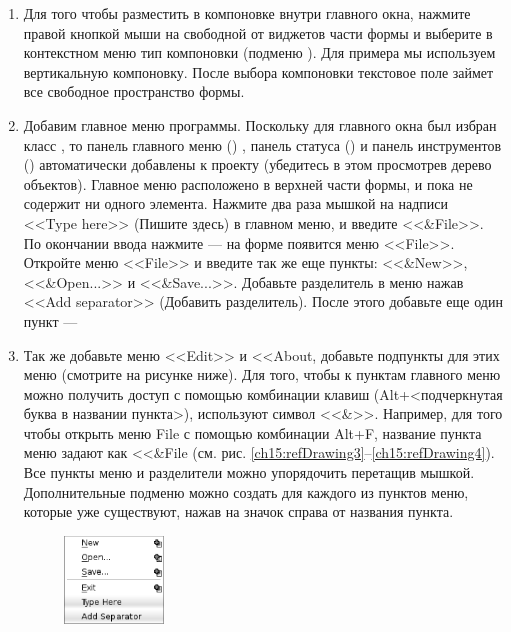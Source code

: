 \begin{enumerate}
\item Для того чтобы разместить  в компоновке внутри главного окна, нажмите правой
кнопкой мыши на свободной от виджетов части формы и выберите в контекстном меню тип компоновки (подменю
). Для примера мы используем вертикальную компоновку. После выбора компоновки текстовое
поле займет все свободное пространство формы.
\item Добавим главное меню программы. Поскольку для главного окна был избран класс , то панель главного меню
() , панель статуса () и панель инструментов () автоматически добавлены к проекту (убедитесь в этом просмотрев дерево объектов). Главное меню расположено в верхней части формы, и пока не содержит ни одного
элемента. Нажмите два раза мышкой на надписи <<Type here>> (Пишите здесь) в главном меню, и введите <<\&File>>. По окончании
ввода нажмите  --- на форме появится меню <<File>>. Откройте меню <<File>> и введите так же
еще пункты: <<\&New>>, <<\&Open...>> и <<\&Save...>>. Добавьте разделитель в меню
нажав <<Add separator>> (Добавить разделитель). После этого добавьте еще один пункт ---  
\item Так же добавьте меню <<Edit>> и <<About, добавьте подпункты для этих меню (смотрите на
рисунке ниже). Для того, чтобы к пунктам главного меню можно получить доступ с помощью комбинации клавиш
(Alt+<подчеркнутая буква в названии пункта>), используют символ <<\&>>. Например,
для того чтобы открыть меню File с помощью комбинации Alt+F, название пункта меню задают как <<\&File
(см. рис. \ref{ch15:refDrawing3}--\ref{ch15:refDrawing4}). Все пункты меню и разделители можно упорядочить перетащив
мышкой. Дополнительные подменю можно создать для каждого из пунктов меню, которые уже существуют, нажав на значок
справа от названия пункта. 

{\footnotesize
   \captionsetup[figure*]{font=footnotesize}
   \begin{figure}%
   \begin{floatrow}[3]
   {\includegraphics[width=0.25\textwidth,keepaspectratio]{img/ris_15_4}}\hspace*{0.03\textwidth}


\end{floatrow}
\end{figure}}
\end{enumerate}
